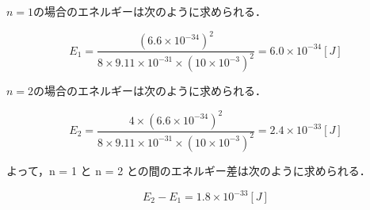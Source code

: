 \documentclass{classes/report}
\begin{document}
$n=1$の場合のエネルギーは次のように求められる．

\begin{equation}
    E_1 = \frac{(6.6 \times 10^{-34})^2}{8 \times 9.11 \times 10^{-31} \times (10 \times 10^{-3} )^2} = 6.0 \times 10^{-34} [J]
\end{equation}

$n=2$の場合のエネルギーは次のように求められる．

\begin{equation}
    E_2 = \frac{4 \times (6.6 \times 10^{-34})^2}{8 \times 9.11 \times 10^{-31} \times (10 \times 10^{-3} )^2} = 2.4 \times 10^{-33} [J]
\end{equation}

よって，n = 1 と n = 2 との間のエネルギー差は次のように求められる．

\begin{equation}
    E_2 - E_1 = 1.8 \times 10^{-33} [J]
\end{equation}


% 


% 

% 

% 
\end{document}
